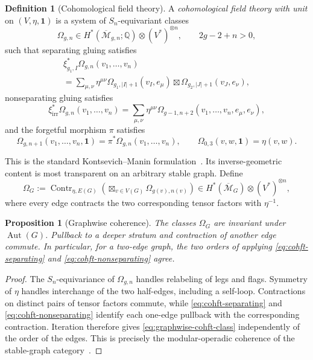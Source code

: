 \documentclass[11pt,letterpaper,twoside]{article}
\theoremstyle{plain}
\newtheorem{proposition}[theorem]{Proposition}
\theoremstyle{definition}
\newtheorem{definition}[theorem]{Definition}
\theoremstyle{remark}
\let\cite\citep
\begin{document}
\begin{definition}[Cohomological field theory]\label{def:cohft}
A \emph{cohomological field theory with unit} on \((V,\eta,\mathbf1)\) is a system of \(S_n\)-equivariant classes
\[
 \Omega_{g,n}\in
 H^*(\overline{\mathcal M}_{g,n};\mathbb Q)
 \otimes(V^*)^{\otimes n},
 \qquad 2g-2+n>0,
\]
such that separating gluing satisfies
\begin{multline}\label{eq:cohft-separating}
 \xi_{g_1,I}^*
 \Omega_{g,n}(v_1,\ldots,v_n)
 \\
 =
 \sum_{\mu,\nu}\eta^{\mu\nu}
 \Omega_{g_1,|I|+1}(v_I,e_\mu)
 \boxtimes
 \Omega_{g_2,|J|+1}(v_J,e_\nu),
\end{multline}
nonseparating gluing satisfies
\begin{equation}\label{eq:cohft-nonseparating}
 \xi_{\mathrm{irr}}^*
 \Omega_{g,n}(v_1,\ldots,v_n)
 =
 \sum_{\mu,\nu}\eta^{\mu\nu}
 \Omega_{g-1,n+2}(v_1,\ldots,v_n,e_\mu,e_\nu),
\end{equation}
and the forgetful morphism \(\pi\) satisfies
\begin{equation}\label{eq:cohft-unit}
 \Omega_{g,n+1}(v_1,\ldots,v_n,\mathbf1)
 =\pi^*\Omega_{g,n}(v_1,\ldots,v_n),
 \qquad
 \Omega_{0,3}(v,w,\mathbf1)=\eta(v,w).
\end{equation}
\end{definition}

This is the standard Kontsevich--Manin formulation~\cite{kontsevichmanin1994}.  Its inverse-geometric content is most transparent on an arbitrary stable graph.  Define
\begin{equation}\label{eq:graphwise-cohft-class}
 \Omega_G
 :=
 \operatorname{Contr}_{\eta,E(G)}
 \left(
 \boxtimes_{v\in V(G)}
 \Omega_{g(v),n(v)}
 \right)
 \in H^*(\overline{\mathcal M}_G)
 \otimes(V^*)^{\otimes n},
\end{equation}
where every edge contracts the two corresponding tensor factors with \(\eta^{-1}\).

\begin{proposition}[Graphwise coherence]\label{prop:cohft-graph-coherence}
The classes \(\Omega_G\) are invariant under \(\operatorname{Aut}(G)\).  Pullback to a deeper stratum and contraction of another edge commute.  In particular, for a two-edge graph, the two orders of applying \eqref{eq:cohft-separating} and \eqref{eq:cohft-nonseparating} agree.
\end{proposition}

\begin{proof}
The \(S_n\)-equivariance of \(\Omega_{g,n}\) handles relabeling of legs and flags.  Symmetry of \(\eta\) handles interchange of the two half-edges, including a self-loop.  Contractions on distinct pairs of tensor factors commute, while \eqref{eq:cohft-separating} and \eqref{eq:cohft-nonseparating} identify each one-edge pullback with the corresponding contraction.  Iteration therefore gives \eqref{eq:graphwise-cohft-class} independently of the order of the edges.  This is precisely the modular-operadic coherence of the stable-graph category~\cite{getzlerkapranov1998}.
\end{proof}
\end{document}
